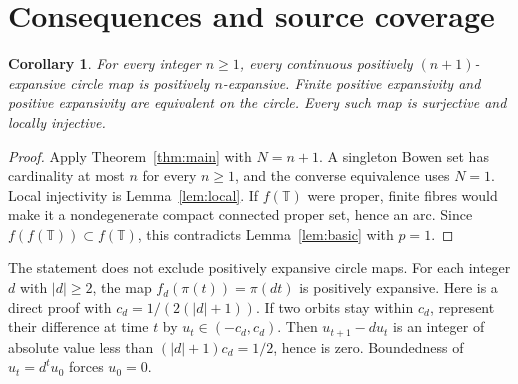 \documentclass[11pt]{article}
\newtheorem{corollary}[theorem]{Corollary}
\newcommand{\T}{\mathbb T}
\begin{document}
\section{Consequences and source coverage}
\begin{corollary}\label{cor:levels}
For every integer $n\ge1$, every continuous positively $(n+1)$-expansive circle map is positively $n$-expansive. Finite positive expansivity and positive expansivity are equivalent on the circle. Every such map is surjective and locally injective.
\end{corollary}
\begin{proof}
Apply Theorem~\ref{thm:main} with $N=n+1$. A singleton Bowen set has cardinality at most $n$ for every $n\ge1$, and the converse equivalence uses $N=1$. Local injectivity is Lemma~\ref{lem:local}. If $f(\T)$ were proper, finite fibres would make it a nondegenerate compact connected proper set, hence an arc. Since $f(f(\T))\subset f(\T)$, this contradicts Lemma~\ref{lem:basic} with $p=1$.
\end{proof}

The statement does not exclude positively expansive circle maps. For each integer $d$ with $|d|\ge2$, the map $f_d(\pi(t))=\pi(dt)$ is positively expansive. Here is a direct proof with $c_d=1/(2(|d|+1))$. If two orbits stay within $c_d$, represent their difference at time $t$ by $u_t\in(-c_d,c_d)$. Then $u_{t+1}-du_t$ is an integer of absolute value less than $(|d|+1)c_d=1/2$, hence is zero. Boundedness of $u_t=d^t u_0$ forces $u_0=0$.
\end{document}
